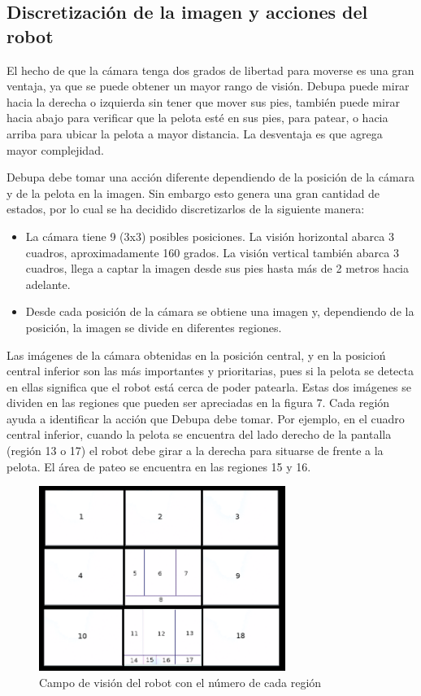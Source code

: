 \documentclass[conference, letterpaper]{IEEEtranMC1}
\begin{document}
\subsection{Discretización de la imagen y acciones del robot}

El hecho de  que la cámara tenga dos grados de libertad para moverse es una gran ventaja, ya que se puede obtener un mayor rango de visión. Debupa puede mirar hacia la derecha o izquierda sin tener que mover sus pies, también puede mirar hacia abajo para verificar que la pelota esté en sus pies, para patear, o hacia arriba para ubicar la pelota a mayor distancia. La desventaja es que agrega mayor complejidad.

Debupa debe tomar una acción diferente dependiendo de la posición de la cámara y de la pelota en la imagen. Sin embargo esto genera una gran cantidad de estados, por lo cual se ha decidido discretizarlos de la siguiente manera:  
\begin{itemize}
\item La cámara tiene 9  (3x3) posibles posiciones. La visión horizontal abarca 3 cuadros, aproximadamente 160 grados. La visión vertical también abarca 3 cuadros, llega a captar la imagen desde sus pies hasta más de 2 metros hacia adelante.
\item Desde cada posición de la cámara se obtiene una imagen y, dependiendo de la posición, la imagen se divide en diferentes regiones. 
\end{itemize}
 
Las im\'agenes de la c\'amara obtenidas en la posici\'on central, y en la posicio\'n central inferior son las m\'as importantes y prioritarias, pues si la pelota se detecta en ellas significa que el robot est\'a cerca de poder patearla. Estas dos im\'agenes se dividen en las regiones que pueden ser apreciadas en la figura 7. Cada región ayuda a identificar la acción que Debupa debe tomar. Por ejemplo, en el cuadro central inferior, cuando la pelota se encuentra del lado derecho de la pantalla (región 13 o 17) el robot debe girar a la derecha para situarse de frente a la pelota. El \'area de pateo se encuentra en las regiones 15 y 16.

\begin{figure}
 \includegraphics[height=6cm]{discretizacion.png}
 \caption{Campo de visión del robot con el número de cada región}
 	\label{fig:figura4}
 \end{figure} 
\end{document}
